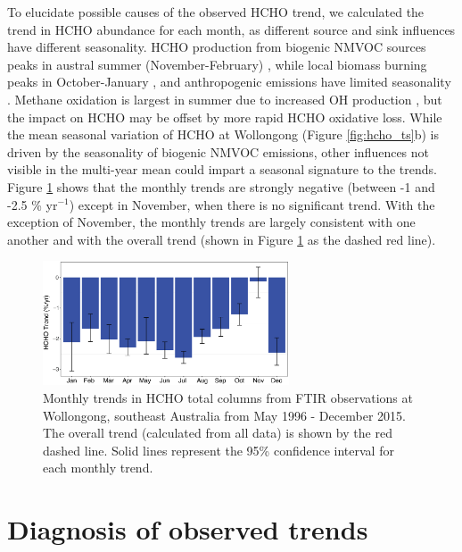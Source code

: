 \documentclass[draft,linenumbers]{AGUJournal}
\begin{document}
To elucidate possible causes of the observed HCHO trend, we  calculated the trend in HCHO abundance for each month, as different source and sink influences have different seasonality. HCHO production from biogenic NMVOC sources peaks in austral summer (November-February) \citep{Zeng2015}, while local biomass burning peaks in October-January \citep{Edwards2006,Zeng2015}, and anthropogenic emissions have limited seasonality \citep{Streets2003,Helmig2009}. Methane oxidation is largest in summer due to increased OH production \citep{Khalil1983}, but the impact on HCHO may be offset by more rapid HCHO oxidative loss. While the mean seasonal variation of HCHO at Wollongong (Figure \ref{fig:hcho_ts}b) is driven by the seasonality of biogenic NMVOC emissions, other influences not visible in the multi-year mean could impart a seasonal signature to the trends. Figure \ref{fig:hcho_mon} shows that the monthly trends are strongly negative (between -1 and -2.5 \% yr$^{-1}$) except in November, when there is no significant trend. With the exception of November, the monthly trends are largely consistent with one another and with the overall trend (shown in Figure \ref{fig:hcho_mon} as the dashed red line). 

\begin{figure}[h]
  \begin{center}
    \includegraphics[width=0.65\textwidth]{HCHO_OE_Wollongong_monthly_trends}
      \caption{Monthly trends in HCHO total columns from FTIR observations at Wollongong, southeast Australia from May 1996 - December 2015. The overall trend (calculated from all data) is shown by the red dashed line. Solid lines represent the 95\% confidence interval for each monthly trend.}
  \label{fig:hcho_mon}
  \end{center}
\end{figure}


\section{Diagnosis of observed trends}
\end{document}
